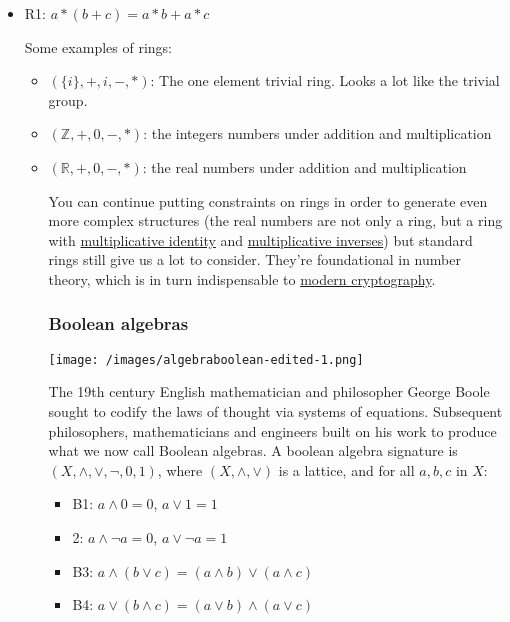 \documentclass{article} %
\begin{document}
\begin{itemize}
{\begin{itemize}
\item{R1: $ a \ast (b + c) = a \ast b + a \ast c$}

Some examples of rings:

\begin{itemize}
\item{$ (\{i\}, +, i, -, \ast)$: The one element trivial ring. Looks a lot like the trivial group.}
\item{$ (\mathbb{Z}, +, 0, -, \ast)$: the integers numbers under addition and multiplication}
\item{$ (\mathbb{R}, +, 0, -, \ast)$: the real numbers under addition and multiplication}

You can continue putting constraints on rings in order to generate even more complex structures (the real numbers are not only a ring, but a ring with \href{https://mathworld.wolfram.com/MultiplicativeIdentity.html}{multiplicative identity} and \href{https://mathworld.wolfram.com/MultiplicativeInverse.html}{multiplicative inverses}) but standard rings still give us a lot to consider. They're foundational in number theory, which is in turn indispensable to \href{https://www.math.utk.edu/~finotti/papers/grad.pdf}{modern cryptography}.

\subsubsection{Boolean algebras}

\texttt{[image: /images/algebraboolean-edited-1.png]}

The 19th century English mathematician and philosopher George Boole sought to codify the laws of thought via systems of equations. Subsequent philosophers, mathematicians and engineers built on his work to produce what we now call Boolean algebras. A boolean algebra signature is $ (X, \land, \lor, \neg, 0, 1)$, where $ (X, \land, \lor)$ is a lattice, and for all $ a, b, c$ in $ X$:

\begin{itemize}
\item{B1: $ a \land 0 = 0$, $ a \lor 1 = 1$}
\item{2: $ a \land \neg a = 0$, $ a \lor \neg a = 1$}
\item{B3: $ a \land (b \lor c) = (a \land b) \lor (a \land c)$}
\item{B4: $ a \lor (b \land c) = (a \lor b) \land (a \lor c)$}
\end{itemize}


\end{itemize}
\end{itemize}}
\end{itemize}
\end{document}
